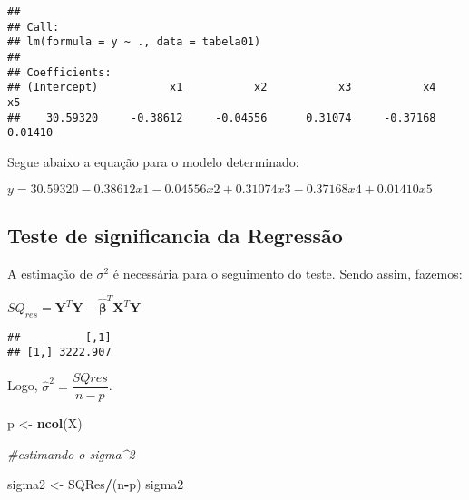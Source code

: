\documentclass[
]{article}
\newenvironment{Shaded}{\begin{snugshade}}{\end{snugshade}}
\newcommand{\CommentTok}[1]{\textcolor[rgb]{0.56,0.35,0.01}{\textit{#1}}}
\newcommand{\KeywordTok}[1]{\textcolor[rgb]{0.13,0.29,0.53}{\textbf{#1}}}
\newcommand{\NormalTok}[1]{#1}
\newcommand{\OperatorTok}[1]{\textcolor[rgb]{0.81,0.36,0.00}{\textbf{#1}}}
\newcommand{\StringTok}[1]{\textcolor[rgb]{0.31,0.60,0.02}{#1}}
\begin{document}
\begin{verbatim}
## 
## Call:
## lm(formula = y ~ ., data = tabela01)
## 
## Coefficients:
## (Intercept)           x1           x2           x3           x4           x5  
##    30.59320     -0.38612     -0.04556      0.31074     -0.37168      0.01410
\end{verbatim}

Segue abaixo a equação para o modelo determinado:

\(y= 30.59320 - 0.38612x1 - 0.04556x2 + 0.31074x3 - 0.37168x4 + 0.01410x5\)

\hypertarget{teste-de-significancia-da-regressuxe3o}{%
\subsection{Teste de significancia da
Regressão}\label{teste-de-significancia-da-regressuxe3o}}

A estimação de \(\sigma^2\) é necessária para o seguimento do teste.
Sendo assim, fazemos:

\(SQ_{res}=\boldsymbol{Y}^{T}\boldsymbol{Y}-\widehat{\boldsymbol{\beta}}^{T}\boldsymbol{X}^{T}\boldsymbol{Y}\)

\begin{Shaded}
\end{Shaded}

\begin{verbatim}
##          [,1]
## [1,] 3222.907
\end{verbatim}

Logo, \(\widehat{\sigma}^2=\dfrac{SQres}{n-p}\).

\begin{Shaded}
\begin{Highlighting}[]
\NormalTok{p <-}\StringTok{ }\KeywordTok{ncol}\NormalTok{(X)}

\CommentTok{#estimando o sigma^2}

\NormalTok{sigma2 <-}\StringTok{ }\NormalTok{SQRes}\OperatorTok{/}\NormalTok{(n}\OperatorTok{-}\NormalTok{p)}
\NormalTok{sigma2}
\end{Highlighting}
\end{Shaded}
\end{document}
